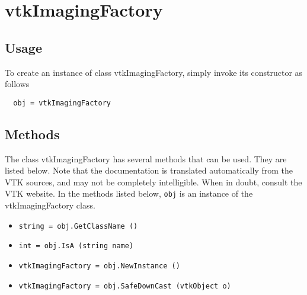 \section{vtkImagingFactory}

\subsection{Usage}


To create an instance of class vtkImagingFactory, simply
invoke its constructor as follows
\begin{verbatim}
  obj = vtkImagingFactory
\end{verbatim}
\subsection{Methods}

The class vtkImagingFactory has several methods that can be used.
  They are listed below.
Note that the documentation is translated automatically from the VTK sources,
and may not be completely intelligible.  When in doubt, consult the VTK website.
In the methods listed below, \verb|obj| is an instance of the vtkImagingFactory class.
\begin{itemize}
\item  \verb|string = obj.GetClassName ()|

\item  \verb|int = obj.IsA (string name)|

\item  \verb|vtkImagingFactory = obj.NewInstance ()|

\item  \verb|vtkImagingFactory = obj.SafeDownCast (vtkObject o)|

\end{itemize}
